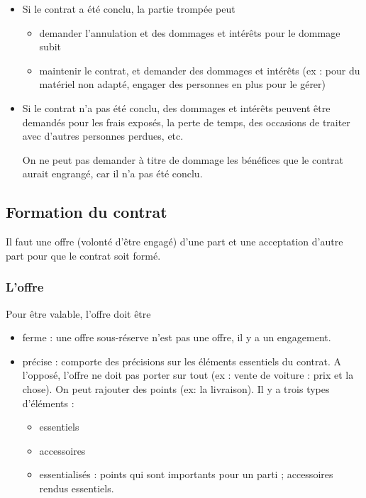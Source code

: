 		\begin{itemize}
			\item Si le contrat a été conclu, la partie trompée peut
			
			\begin{itemize}
				\item demander l'annulation et des dommages et intérêts pour le dommage subit
				\item maintenir le contrat, et demander des dommages et intérêts (ex : pour du matériel non adapté, engager des personnes en plus pour le gérer)
			\end{itemize}
			
			\item Si le contrat n'a pas été conclu, des dommages et intérêts peuvent être demandés pour les frais exposés, la perte de temps, des occasions de traiter avec d'autres personnes perdues, etc. 
			
			On ne peut pas demander à titre de dommage les bénéfices que le contrat aurait engrangé, car il n'a pas été conclu.
		\end{itemize}
		
		
		\subsection{Formation du contrat}
				
		Il faut une offre (volonté d'être engagé) d'une part et une acceptation d'autre part pour que le contrat soit formé.
		
			\subsubsection{L'offre}
		
			Pour être valable, l'offre doit être
		
			\begin{itemize}
				\item ferme : une offre sous-réserve n'est pas une offre, il y a un engagement.
				\item précise : comporte des précisions sur les éléments essentiels du contrat. A l'opposé, l'offre ne doit pas porter sur tout (ex : vente de voiture : prix et la chose). On peut rajouter des points (ex: la livraison). Il y a trois types d'éléments :
			
				\begin{itemize}
					\item essentiels
					\item accessoires
					\item essentialisés : points qui sont importants pour un parti ; accessoires rendus essentiels.
				\end{itemize}
			\end{itemize}
		

